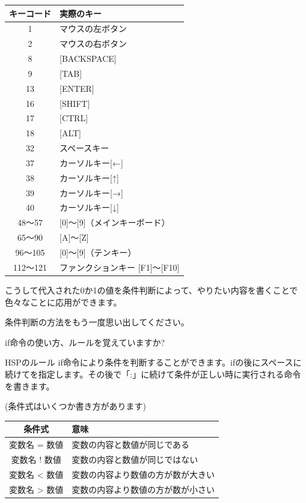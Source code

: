 \documentclass[text04.tex]{subfiles}
\begin{document}
\begin{center}
    \begin{tabular}{c|l} \hline
        キーコード & 実際のキー \\ \hline
        1 & マウスの左ボタン \\
        2 & マウスの右ボタン \\
        8 & [BACKSPACE] \\
        9 & [TAB] \\
        13 & [ENTER] \\
        16 & [SHIFT] \\
        17 & [CTRL] \\
        18 & [ALT] \\
        32 & スペースキー \\
        37 & カーソルキー[←] \\
        38 & カーソルキー[↑] \\
        39 & カーソルキー[→] \\
        40 & カーソルキー[↓] \\
        48〜57 & [0]〜[9]（メインキーボード） \\
        65〜90 & [A]〜[Z] \\
        96〜105 & [0]〜[9]（テンキー） \\
        112〜121 & ファンクションキー [F1]〜[F10] \\ \hline
    \end{tabular}
\end{center}

こうして代入された0か1の値を条件判断によって、やりたい内容を書くことで色々なことに応用ができます。


条件判断の方法をもう一度思い出してください。

if命令の使い方、ルールを覚えていますか?

\begin{itembox}[c]{HSPのルール}
    if命令により条件を判断することができます。ifの後にスペースに続けてを指定します。その後で「:」に続けて条件が正しい時に実行される命令を書きます。
\end{itembox}

\begin{center}
    (条件式はいくつか書き方があります)
\end{center}
\begin{center}
    \begin{tabular}{cl} \hline
        条件式 & 意味 \\ \hline
        変数名 = 数値 & 変数の内容と数値が同じである \\
        変数名 ! 数値 & 変数の内容と数値が同じではない \\
        変数名 {\textless} 数値 & 変数の内容より数値の方が数が大きい \\
        変数名 {\textgreater} 数値 & 変数の内容より数値の方が数が小さい \\ \hline
    \end{tabular}
\end{center}
\end{document}
